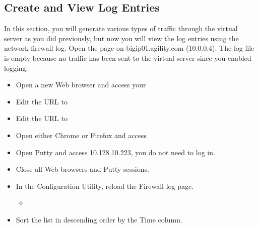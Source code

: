 \documentclass[letterpaper,10pt,english]{sphinxmanual}
\begin{document}
\subsection{Create and View Log Entries}
\label{\detokenize{class1/module1/lab3:create-and-view-log-entries}}
In this section, you will generate various types of traffic through the
virtual server as you did previously, but now you will view the log
entries using the network firewall log. Open the  page on bigip01.agility.com (10.0.0.4). The
log file is empty because no traffic has been sent to the virtual server
since you enabled logging.
\begin{itemize}
\item {} 
Open a new Web browser and access your 

\item {} 
Edit the URL to

\item {} 
Edit the URL to 

\item {} 
Open either Chrome or Firefox and access

\item {} 
Open Putty and access 10.128.10.223, you do not need to log in.

\item {} 
Close all Web browsers and Putty sessions.

\item {} 
In the Configuration Utility, reload the Firewall log page.
\begin{itemize}
\item {} 

\end{itemize}

\item {} 
Sort the list in descending order by the Time column.

\end{itemize}

\end{document}
